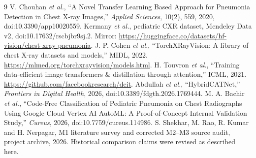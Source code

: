 \documentclass[conference]{IEEEtran}
\begin{document}
\begin{thebibliography}{9}
 V. Chouhan \emph{et al.}, ``A Novel Transfer Learning Based Approach for Pneumonia Detection in Chest X-ray Images,'' \emph{Applied Sciences}, 10(2), 559, 2020, doi:10.3390/app10020559.
 Kermany \emph{et al.}, pediatric CXR dataset, Mendeley Data v2, doi:10.17632/rscbjbr9sj.2. Mirror: \url{https://huggingface.co/datasets/hf-vision/chest-xray-pneumonia}.
 J. P. Cohen \emph{et al.}, ``TorchXRayVision: A library of chest X-ray datasets and models,'' MIDL, 2022. \url{https://mlmed.org/torchxrayvision/models.html}.
 H. Touvron \emph{et al.}, ``Training data-efficient image transformers \& distillation through attention,'' ICML, 2021. \url{https://github.com/facebookresearch/deit}.
 Abdullah \emph{et al.}, ``HybridCATNet,'' \emph{Frontiers in Digital Health}, 2026, doi:10.3389/fdgth.2026.1769444.
 M. A. Bachir \emph{et al.}, ``Code-Free Classification of Pediatric Pneumonia on Chest Radiographs Using Google Cloud Vertex AI AutoML: A Proof-of-Concept Internal Validation Study,'' \emph{Cureus}, 2026, doi:10.7759/cureus.114986.
 S. Shekhar, M. Rao, R. Kumar and H. Nerpagar, M1 literature survey and corrected M2--M3 source audit, project archive, 2026. Historical comparison claims were revised as described here.
\end{thebibliography}
\end{document}
